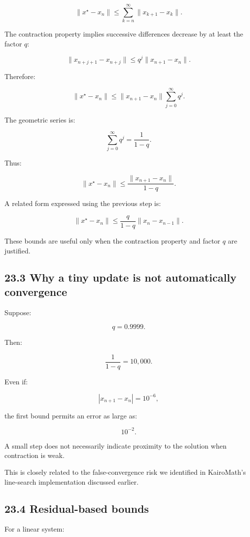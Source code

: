 \[ \|x^\star-x_n\| \le \sum_{k=n}^{\infty} \|x_{k+1}-x_k\|. \]

The contraction property implies successive differences decrease by at least the factor \(q\):

\[ \|x_{n+j+1}-x_{n+j}\| \le q^j\|x_{n+1}-x_n\|. \]

Therefore:

\[ \|x^\star-x_n\| \le \|x_{n+1}-x_n\| \sum_{j=0}^{\infty}q^j. \]

The geometric series is:

\[ \sum_{j=0}^{\infty}q^j=\frac1{1-q}. \]

Thus:

\[ \boxed{ \|x^\star-x_n\| \le \frac{\|x_{n+1}-x_n\|}{1-q} }. \]

A related form expressed using the previous step is:

\[ \boxed{ \|x^\star-x_n\| \le \frac{q}{1-q}\|x_n-x_{n-1}\| }. \]

These bounds are useful only when the contraction property and factor \(q\) are justified.

\subsection{23.3 Why a tiny update is not automatically convergence}\label{02-foundations-ii-ch028-why-a-tiny-update-is-not-automatically-convergence}

Suppose:

\[ q=0.9999. \]

Then:

\[ \frac1{1-q}=10{,}000. \]

Even if:

\[ |x_{n+1}-x_n|=10^{-6}, \]

the first bound permits an error as large as:

\[ 10^{-2}. \]

A small step does not necessarily indicate proximity to the solution when contraction is weak.

This is closely related to the false-convergence risk we identified in KairoMath's line-search implementation discussed earlier.

\subsection{23.4 Residual-based bounds}\label{02-foundations-ii-ch028-residual-based-bounds}

For a linear system:

